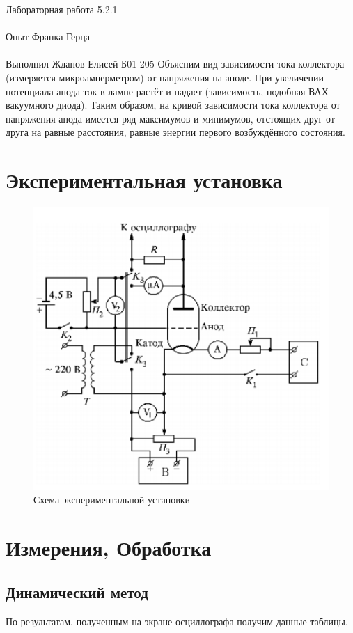 \documentclass{astroedu-lab}
\begin{document}
\begin{problem}{\huge Лабораторная работа 5.2.1\\\\Опыт Франка-Герца\\\\Выполнил Жданов Елисей Б01-205}
Объясним вид зависимости тока коллектора (измеряется микроамперметром) от напряжения на аноде. При увеличении потенциала анода ток в лампе растёт и падает (зависимость, подобная ВАХ вакуумного диода). Таким образом, на кривой зависимости тока коллектора от напряжения анода имеется ряд максимумов и минимумов, отстоящих друг от друга на равные расстояния, равные энергии первого возбуждённого состояния.

\newpage

\section{Экспериментальная установка}

\begin{figure}[h]
    \centering
    \includegraphics[width=12cm]{fig3.PNG}
    \caption{Схема экспериментальной установки}
    \label{fig:vac}
\end{figure}

\newpage

\section{Измерения, Обработка}

\subsection{Динамический метод}

По результатам, полученным на экране осциллографа получим данные таблицы.


\end{problem}
\end{document}
